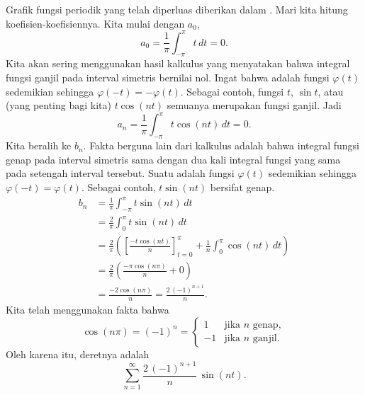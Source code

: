 \begin{example}
Grafik fungsi periodik yang telah diperluas diberikan dalam
.
Mari kita hitung koefisien-koefisiennya.  Kita mulai dengan $a_0$,
\begin{equation*}
a_0 = \frac{1}{\pi} \int_{-\pi}^\pi t \,dt = 0 .
\end{equation*}
Kita akan sering menggunakan hasil kalkulus yang menyatakan bahwa integral fungsi
ganjil pada interval simetris bernilai nol.  Ingat bahwa
\emph{} adalah
fungsi $\varphi(t)$ sedemikian sehingga $\varphi(-t) = -\varphi(t)$.
Sebagai contoh,
fungsi $t$, $\sin t$, atau (yang penting bagi kita)
$t \cos (nt)$ semuanya merupakan fungsi ganjil.  Jadi
\begin{equation*}
a_n = \frac{1}{\pi} \int_{-\pi}^\pi t \cos (nt) \,dt = 0 .
\end{equation*}
Kita beralih ke $b_n$.  Fakta berguna lain dari kalkulus
adalah bahwa integral fungsi genap pada
interval simetris sama dengan
dua kali integral fungsi yang sama pada setengah interval tersebut.
Suatu \emph{}
adalah
fungsi $\varphi(t)$ sedemikian sehingga $\varphi(-t) = \varphi(t)$.  Sebagai contoh,
$t \sin (nt)$ bersifat genap.
\begin{equation*}
\begin{split}
b_n & = \frac{1}{\pi} \int_{-\pi}^\pi t \sin (nt) \,dt \\
& = \frac{2}{\pi} \int_{0}^\pi t \sin (nt) \,dt \\
& = \frac{2}{\pi} \left(
\left[ \frac{-t \cos (nt)}{n} \right]_{t=0}^{\pi}
+
\frac{1}{n}
\int_{0}^\pi \cos (nt) \,dt
\right)
\\
& = \frac{2}{\pi} \left(
\frac{-\pi \cos (n\pi)}{n}
+
0
\right) \\
& =  \frac{-2 \cos (n\pi)}{n}
=  \frac{2 \,{(-1)}^{n+1}}{n} .
\end{split}
\end{equation*}
Kita telah menggunakan fakta bahwa
\begin{equation*}
\cos (n\pi) = {(-1)}^n =
\begin{cases}
1 & \text{jika } n \text{ genap} , \\
-1 & \text{jika } n \text{ ganjil} .
\end{cases}
\end{equation*}
Oleh karena itu, deretnya adalah
\begin{equation*}
\sum_{n=1}^\infty
\frac{2 \,{(-1)}^{n+1}}{n} \,
\sin (n t) .
\end{equation*}


\end{example}
